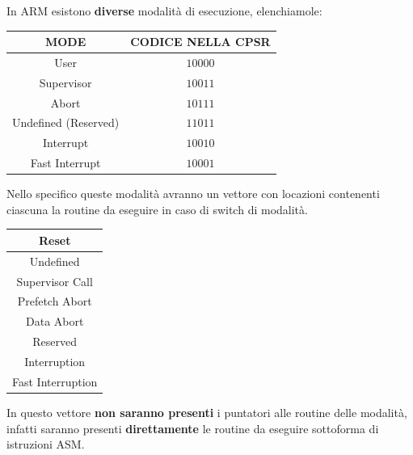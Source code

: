 \documentclass{article}
\begin{document}
In ARM esistono \textbf{diverse} modalità di esecuzione, elenchiamole:

\vspace*{5px}

\begin{center}
    \begin{tabular}{|c|c|}
    \hline
    MODE & CODICE NELLA CPSR  \\
    \hline
    User & $10000$ \\
    \hline
    Supervisor & $10011$ \\
    \hline
    Abort & $10111$ \\
    \hline
    Undefined (Reserved) & $11011$ \\
    \hline
    Interrupt & $10010$ \\
    \hline
    Fast Interrupt & $10001$ \\
    \hline
    \end{tabular}
\end{center}

\vspace*{5px}


Nello specifico queste modalità avranno un vettore con locazioni contenenti ciascuna la routine da eseguire in caso di switch di modalità.

\vspace*{5px}

\begin{center}
        \begin{tabular}{ |c| } %
         \hline
         Reset \\
         \hline
         Undefined \\ 
         \hline
         Supervisor Call \\
         \hline
         Prefetch Abort \\
         \hline
         Data Abort \\
         \hline
         Reserved \\
         \hline
         Interruption \\
         \hline
         Fast Interruption \\
         \hline
        \end{tabular}
    \end{center}

\vspace*{5px}

In questo vettore \textbf{non saranno presenti} i puntatori alle routine delle modalità, infatti saranno presenti \textbf{direttamente} le routine da eseguire sottoforma di istruzioni ASM.
\end{document}
